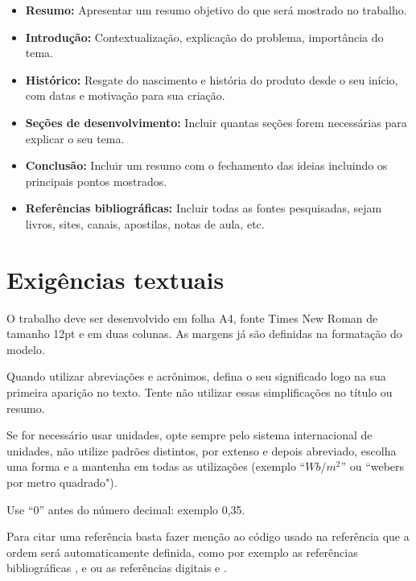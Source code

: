 \documentclass[conference]{ModeloA}
\begin{document}
\begin{itemize}
	\item {\bf Resumo:} Apresentar um resumo objetivo do que será mostrado no trabalho.
	\item {\bf Introdução: }
			Contextualização, explicação do problema, importância do tema.
	\item {\bf Histórico:} 
			Resgate do nascimento e história do produto desde o seu início, com datas e motivação para sua criação.
	\item {\bf Seções de desenvolvimento:}
			Incluir quantas seções forem necessárias para explicar o seu tema.
	\item {\bf Conclusão:} 
			Incluir um resumo com o fechamento das ideias incluindo os principais pontos mostrados.
	\item {\bf Referências bibliográficas:}
			Incluir todas as fontes pesquisadas, sejam livros, sites, canais, apostilas, notas de aula, etc.
\end{itemize}


\section{Exigências textuais}

O trabalho deve ser desenvolvido em folha A4, fonte Times New Roman de tamanho 12pt e em duas colunas. As margens já são definidas na formatação do modelo.

Quando utilizar abreviações e acrônimos, defina o seu significado logo na sua primeira aparição no texto. Tente não utilizar essas simplificações no título ou resumo.

Se for necessário usar unidades, opte sempre pelo sistema internacional de unidades, não utilize padrões distintos, por extenso e depois abreviado, escolha uma forma e a mantenha em todas as utilizações (exemplo ``$Wb/m^2$'' ou ``webers por metro quadrado").

Use ``0'' antes do número decimal: exemplo 0,35.

Para citar uma referência basta fazer menção ao código usado na referência que a ordem será automaticamente definida, como por exemplo as referências bibliográficas \cite{Diniz},  \cite{Bazzo} e \cite{Faria} ou as referências digitais \cite{overleafFig} e \cite{overleafTab}.

\end{document}
